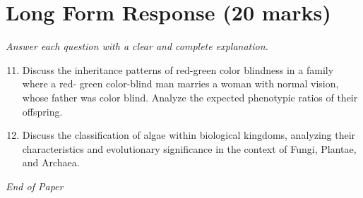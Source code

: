 \documentclass[12pt]{article}
\begin{document}
\section*{Long Form Response (20 marks)}
\textit{Answer each question with a clear and complete explanation.}
\begin{enumerate}[label=\arabic*.]
\setcounter{enumi}{10}
\item Discuss the inheritance patterns of red-green color blindness in a family where a red- green color-blind man marries a woman with normal vision, whose father was color blind. Analyze the expected phenotypic ratios of their offspring.
\item Discuss the classification of algae within biological kingdoms, analyzing their characteristics and evolutionary significance in the context of Fungi, Plantae, and Archaea.
\end{enumerate}

\vfill
\noindent\textit{End of Paper}
\end{document}
